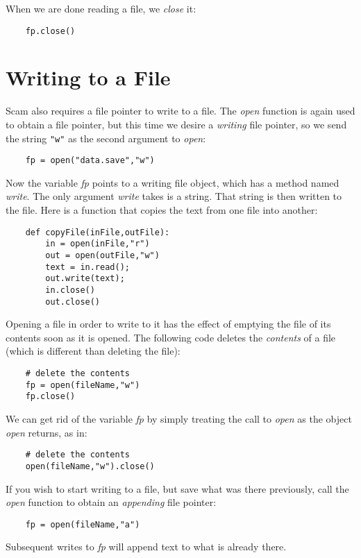 When we are done reading a file, we {\it close} it:

\begin{verbatim}
    fp.close()
\end{verbatim}

\section{Writing to a File}

Scam also requires a file pointer to write to 
a file. The {\it open} function is again used to obtain
a file pointer, but this time we desire a {\it writing}
file pointer, so we send the string {\tt "w"} as the
second argument to {\it open}:

\begin{verbatim}
    fp = open("data.save","w")
\end{verbatim}

Now the variable {\it fp} points to a writing file object, which
has a method named {\it write}. The only argument {\it write} takes
is a string. That string is then written to the file. Here is
a function that copies the text from one file into another:

\begin{verbatim}
    def copyFile(inFile,outFile):
        in = open(inFile,"r")
        out = open(outFile,"w")
        text = in.read();
        out.write(text);
        in.close()
        out.close()
\end{verbatim}
            
Opening a file in order to write to
it has the effect of emptying the file of its contents
soon as it is opened.
The following code deletes
the {\it contents} of a file (which is different than
deleting the file):

\begin{verbatim}
    # delete the contents
    fp = open(fileName,"w")
    fp.close()
\end{verbatim}

We can get rid of the variable {\it fp} by simply treating the
call to {\it open} as the object {\it open} returns, as in:

\begin{verbatim}
    # delete the contents
    open(fileName,"w").close()
\end{verbatim}

If you wish to start writing to a file, but save what was
there previously, call the {\it open} function to obtain
an {\it appending} file pointer:

\begin{verbatim}
    fp = open(fileName,"a")
\end{verbatim}

Subsequent writes to {\it fp} will append text to what is already there.
